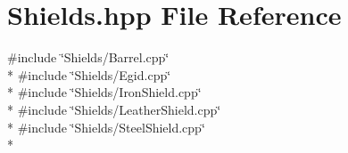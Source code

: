 \section{Shields.\-hpp File Reference}
\label{_shields_8hpp}
{\ttfamily \#include \char`\"{}Shields/\-Barrel.\-cpp\char`\"{}}\\*
{\ttfamily \#include \char`\"{}Shields/\-Egid.\-cpp\char`\"{}}\\*
{\ttfamily \#include \char`\"{}Shields/\-Iron\-Shield.\-cpp\char`\"{}}\\*
{\ttfamily \#include \char`\"{}Shields/\-Leather\-Shield.\-cpp\char`\"{}}\\*
{\ttfamily \#include \char`\"{}Shields/\-Steel\-Shield.\-cpp\char`\"{}}\\*
